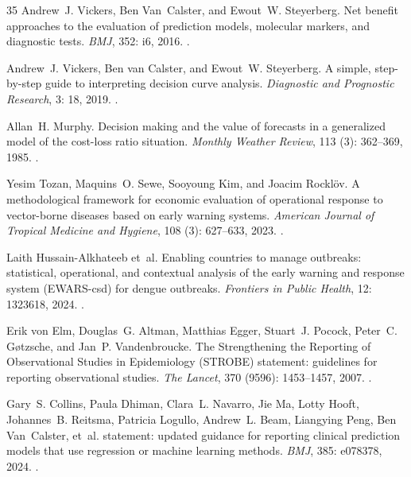 \documentclass[11pt,a4paper]{article}
\begin{document}
\begin{thebibliography}{35}
Andrew~J. Vickers, Ben Van~Calster, and Ewout~W. Steyerberg.
\newblock Net benefit approaches to the evaluation of prediction models,
  molecular markers, and diagnostic tests.
\newblock \emph{BMJ}, 352: i6, 2016.
\newblock {}.

Andrew~J. Vickers, Ben van Calster, and Ewout~W. Steyerberg.
\newblock A simple, step-by-step guide to interpreting decision curve analysis.
\newblock \emph{Diagnostic and Prognostic Research}, 3: 18, 2019.
\newblock {}.

Allan~H. Murphy.
\newblock Decision making and the value of forecasts in a generalized model of
  the cost-loss ratio situation.
\newblock \emph{Monthly Weather Review}, 113 (3): 362--369,
  1985.
\newblock {}.

Yesim Tozan, Maquins~O. Sewe, Sooyoung Kim, and Joacim Rockl{\"o}v.
\newblock A methodological framework for economic evaluation of operational
  response to vector-borne diseases based on early warning systems.
\newblock \emph{American Journal of Tropical Medicine and Hygiene},
  108 (3): 627--633, 2023.
\newblock {}.

Laith Hussain-Alkhateeb et~al.
\newblock Enabling countries to manage outbreaks: statistical, operational, and
  contextual analysis of the early warning and response system ({EWARS-csd})
  for dengue outbreaks.
\newblock \emph{Frontiers in Public Health}, 12: 1323618, 2024.
\newblock {}.

Erik von Elm, Douglas~G. Altman, Matthias Egger, Stuart~J. Pocock, Peter~C.
  G{\o}tzsche, and Jan~P. Vandenbroucke.
\newblock The {Strengthening} the {Reporting} of {Observational} {Studies} in
  {Epidemiology} ({STROBE}) statement: guidelines for reporting observational
  studies.
\newblock \emph{The Lancet}, 370 (9596): 1453--1457, 2007.
\newblock {}.

Gary~S. Collins, Paula Dhiman, Clara~L. Navarro, Jie Ma, Lotty Hooft,
  Johannes~B. Reitsma, Patricia Logullo, Andrew~L. Beam, Liangying Peng, Ben
  Van~Calster, et~al.
 statement: updated guidance for reporting clinical
  prediction models that use regression or machine learning methods.
\newblock \emph{BMJ}, 385: e078378, 2024.
\newblock {}.


\end{thebibliography}
\end{document}
